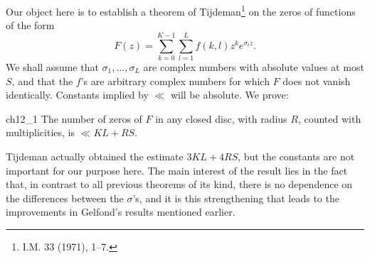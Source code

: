 Our object here is to establish a theorem of Tijdeman\footnote{I.M. 33 (1971), 1--7.} on the zeros of functions of the form
\[F(z) = \sum_{k=0}^{K-1} \sum_{l=1}^{L} f(k,l) z^{k} e^{\sigma_{l} z}.\]
We shall assume that $\sigma_1, \ldots, \sigma_L$ are complex numbers with absolute values at most $S$, and that the $f$'s are arbitrary complex numbers for which $F$ does not vanish identically. Constants implied by $\ll$ will be absolute. We prove:

\begin{mylemma}{}{ch12_1}
The number of zeros of $F$ in any closed disc, with radius $R$, counted with multiplicities, is $\ll KL + RS$.
\end{mylemma}

Tijdeman actually obtained the estimate $3KL + 4RS$, but the constants are not important for our purpose here. The main interest of the result lies in the fact that, in contrast to all previous theorems of its kind, there is no dependence on the differences between the $\sigma$'s, and it is this strengthening that leads to the improvements in Gelfond's results mentioned earlier.


